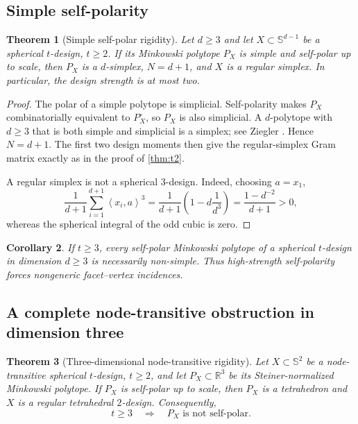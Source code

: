 \documentclass[11pt]{amsart}
\newtheorem{theorem}{Theorem}[section]
\newtheorem{corollary}[theorem]{Corollary}
\theoremstyle{definition}
\theoremstyle{remark}
\newcommand{\R}{\mathbb R}
\newcommand{\Sph}{\mathbb S}
\newcommand{\ip}[2]{\left\langle #1,#2\right\rangle}
\begin{document}
\subsection{Simple self-polarity}

\begin{theorem}[Simple self-polar rigidity]\label{thm:simple}
Let $d\ge3$ and let $X\subset\Sph^{d-1}$ be a spherical $t$-design, $t\ge2$.  If its Minkowski polytope $P_X$ is simple and self-polar up to scale, then $P_X$ is a $d$-simplex, $N=d+1$, and $X$ is a regular simplex.  In particular, the design strength is at most two.
\end{theorem}

\begin{proof}
The polar of a simple polytope is simplicial.  Self-polarity makes $P_X$ combinatorially equivalent to $P_X^\circ$, so $P_X$ is also simplicial.  A $d$-polytope with $d\ge3$ that is both simple and simplicial is a simplex; see Ziegler \cite{Ziegler1995}.  Hence $N=d+1$.  The first two design moments then give the regular-simplex Gram matrix exactly as in the proof of \cref{thm:t2}.

A regular simplex is not a spherical $3$-design.  Indeed, choosing $a=x_1$,
\[
 \frac1{d+1}\sum_{i=1}^{d+1}\ip{x_i}{a}^3
 =\frac1{d+1}\left(1-d\frac1{d^3}\right)
 =\frac{1-d^{-2}}{d+1}>0,
\]
whereas the spherical integral of the odd cubic is zero.  \qedhere
\end{proof}

\begin{corollary}
If $t\ge3$, every self-polar Minkowski polytope of a spherical $t$-design in dimension $d\ge3$ is necessarily non-simple.  Thus high-strength self-polarity forces nongeneric facet--vertex incidences.
\end{corollary}

\subsection{A complete node-transitive obstruction in dimension three}

\begin{theorem}[Three-dimensional node-transitive rigidity]\label{thm:3d}
Let $X\subset\Sph^2$ be a node-transitive spherical $t$-design, $t\ge2$, and let $P_X\subset\R^3$ be its Steiner-normalized Minkowski polytope.  If $P_X$ is self-polar up to scale, then $P_X$ is a tetrahedron and $X$ is a regular tetrahedral $2$-design.  Consequently,
\begin{equation}\label{eq:no3d}
 \boxed{t\ge3\quad\Longrightarrow\quad P_X\text{ is not self-polar}.}
\end{equation}
\end{theorem}
\end{document}
